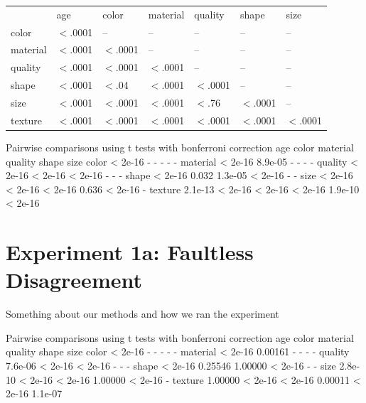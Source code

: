 \documentclass{pnastwo}
\begin{document}
\begin{article}
\begin{materials}
\begin{table}
\begin{tabular}{l l l l l l l}
       &  age & color & material & quality & shape & size\\
color &     $<$.0001 &    --   &    --   &   -- &   --  & --\\
material &  $<$.0001 &  $<$.0001 &      --  &    -- &   -- &  --\\
quality &   $<$.0001 & $<$.0001 &         $<$.0001 &      --  &  -- &  --\\
shape &     $<$.0001 & $<$.04 &        $<$.0001 &  $<$.0001 &    -- &  --\\
size &      $<$.0001 & $<$.0001 &        $<$.0001 &  $<$.76 &    $<$.0001 &   --\\
texture &   $<$.0001 & $<$.0001 &       $<$.0001 &  $<$.0001 &    $<$.0001 &    $<$.0001
\end{tabular}
\label{tab:bonferronicorpus}
\end{table}

Pairwise comparisons using t tests with bonferroni correction
         age     color   material quality shape   size   
         color    < 2e-16 -       -        -       -       -      
         material < 2e-16 8.9e-05 -        -       -       -      
         quality  < 2e-16 < 2e-16 < 2e-16  -       -       -      
         shape    < 2e-16 0.032   1.3e-05  < 2e-16 -       -      
         size     < 2e-16 < 2e-16 < 2e-16  0.636   < 2e-16 -      
         texture  2.1e-13 < 2e-16 < 2e-16  < 2e-16 1.9e-10 < 2e-16

\section{Experiment 1a: Faultless Disagreement}
Something about our methods and how we ran the experiment


Pairwise comparisons using t tests with bonferroni correction
		         age     color   material quality shape   size   
         color    < 2e-16 -       -        -       -       -      
         material < 2e-16 0.00161 -        -       -       -      
         quality  7.6e-06 < 2e-16 < 2e-16  -       -       -      
         shape    < 2e-16 0.25546 1.00000  < 2e-16 -       -      
         size     2.8e-10 < 2e-16 < 2e-16  1.00000 < 2e-16 -      
         texture  1.00000 < 2e-16 < 2e-16  0.00011 < 2e-16 1.1e-07


\end{materials}
\end{article}
\end{document}

